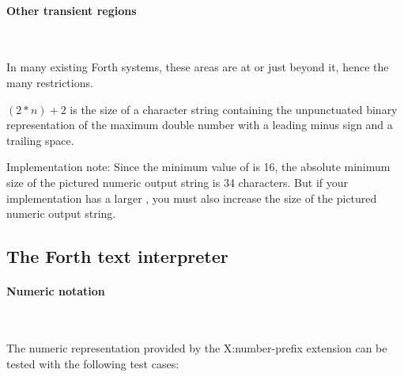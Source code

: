 \setcounter{paragraph}{5}
\paragraph{Other transient regions} ~ %

In many existing Forth systems, these areas are at  or
just beyond it, hence the many restrictions.

$(2*n)+2$ is the size of a character string containing the
unpunctuated binary representation of the maximum double number with
a leading minus sign and a trailing space.

Implementation note: Since the minimum value of  is 16, the
absolute minimum size of the pictured numeric output string is 34
characters. But if your implementation has a larger , you must
also increase the size of the pictured numeric output string.

\subsection{The Forth text interpreter} %

\setcounter{subsubsection}{1}
\setcounter{paragraph}{2}
\paragraph{Numeric notation} ~%
\label{rat:notation:numeric}

The numeric representation provided by the \textsf{X:number-prefix}
extension can be tested with the following test cases:

\begin{tt}
	 \\
	 \\
	 \\
	 \\
	 \\
	 \\
	 \\
	 \\
	 \\
	 \\
	 \\
	 \\
	 \\
\end{tt}

